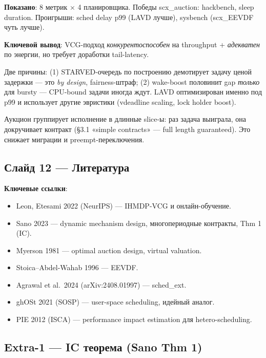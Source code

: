 \documentclass[11pt,a4paper]{article}
\begin{document}
\textbf{Показано}: 8 метрик × 4 планировщика. Победы scx\_auction:
hackbench, sleep duration. Проигрыши: sched delay p99 (LAVD лучше),
sysbench (scx\_EEVDF чуть лучше).

\textbf{Ключевой вывод}: VCG-подход \emph{конкурентоспособен} на
throughput + \emph{адекватен} по энергии, но требует доработки
tail-latency.

\begin{ask}
Две причины: (1) STARVED-очередь по построению демотирует задачу ценой
задержки — это \emph{by design}, fairness-штраф; (2) wake-boost
половинит gap \emph{только} для bursty — CPU-bound задачи иногда ждут.
LAVD оптимизирован именно под p99 и использует другие эвристики
(vdeadline scaling, lock holder boost).
\end{ask}

\begin{ask}
Аукцион группирует исполнение в длинные slice-ы: раз задача выиграла,
она докручивает контракт (§3.1 «simple contracts» — full length
guaranteed). Это снижает миграции и preempt-переключения.
\end{ask}

\subsection*{Слайд 12 — Литература}

\textbf{Ключевые ссылки}:
\begin{itemize}
  \item Leon, Etesami 2022 (NeurIPS) — IHMDP-VCG и онлайн-обучение.
  \item Sano 2023 — dynamic mechanism design, многопериодные контракты, Thm 1 (IC).
  \item Myerson 1981 — optimal auction design, virtual valuation.
  \item Stoica--Abdel-Wahab 1996 — EEVDF.
  \item Agrawal et al.\ 2024 (arXiv:2408.01997) — sched\_ext.
  \item ghOSt 2021 (SOSP) — user-space scheduling, идейный аналог.
  \item PIE 2012 (ISCA) — performance impact estimation для hetero-scheduling.
\end{itemize}

\subsection*{Extra-1 — IC теорема (Sano Thm 1)}
\end{document}
